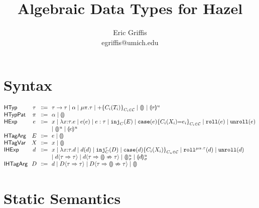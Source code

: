 \documentclass{article}
\title{Algebraic Data Types for Hazel}
\author{Eric Griffis \\ egriffis@umich.edu}
\date{}
\let\originalleft\left
\let\originalright\right
\renewcommand{\left}{\mathopen{}\mathclose\bgroup\originalleft}
\renewcommand{\right}{\aftergroup\egroup\originalright}
\newcommand\Sort[1]{\mathsf{#1}}
\newcommand\IHExp{\Sort{IHExp}}
\newcommand\IHTagArg{\Sort{IHTagArg}}
\newcommand\HExp{\Sort{HExp}}
\newcommand\HTagArg{\Sort{HTagArg}}
\newcommand\HTagVar{\Sort{HTagVar}}
\newcommand\HTyp{\Sort{HTyp}}
\newcommand\HTypPat{\Sort{HTypPat}}
\newcommand\hole[2][]{\llparenthesis#1\rrparenthesis^{#2}}
\newcommand\Dhole[3][]{\llparenthesis#1\rrparenthesis_{#2}^{#3}}
\newcommand\Tarrow[2]{#1 \rightarrow #2}
\newcommand\Trec[2]{\mu{#1}.{#2}}
\newcommand\Tsum[1]{+\mathopen{}\left\{#1\right\}}
\newcommand\TagSet{\mathcal{C}}
\newcommand\literal[1]{\mathtt{#1}}
\newcommand\asc[2]{{#1}:{#2}}
\newcommand\Efun[3]{\lambda{#1}{:}{#2}.{#3}}
\newcommand\Eapp[2]{{#1}\left({#2}\right)}
\newcommand\Einj[2]{\literal{inj}_{#1}\left({#2}\right)}
\newcommand\Ecase[2]{\literal{case} \left({#1}\right) \left\{{#2}\right\}}
\newcommand\Eroll[1]{\literal{roll}\left(#1\right)}
\newcommand\Eunroll[1]{\literal{unroll}\left(#1\right)}
\newcommand\Dfun[3]{\lambda{#1}{:}{#2}.{#3}}
\newcommand\Dapp[2]{{#1}\left({#2}\right)}
\newcommand\Dinj[3]{\literal{inj}_{#1}^{#2}\left({#3}\right)}
\newcommand\Dcase[2]{\literal{case} \left({#1}\right) \left\{{#2}\right\}}
\newcommand\Droll[3]{\literal{roll}^{\Trec{#1}{#2}}\left({#3}\right)}
\newcommand\Dunroll[1]{\literal{unroll}\left(#1\right)}
\newcommand\cast[3]{{#1}\langle{#2}\Rightarrow{#3}\rangle}
\newcommand\castfail[3]{{#1}\langle{#2}\Rightarrow{\llparenthesis\rrparenthesis}\nRightarrow{#3}\rangle}
\begin{document}
\maketitle


\section{Syntax}

\[
  \arraycolsep=0pt
  \begin{array}{l@{~~}c@{~~}c@{~~}l}
    \HTyp & \tau & \Coloneqq &
      \Tarrow{\tau}{\tau}
      \mid \alpha
      \mid \Trec{\pi}{\tau}
      \mid \Tsum{C_i(T_i)}_{C_i \in \TagSet}
      \mid \hole{}
      \mid \hole[\tau]{u}
      \\
    \HTypPat & \pi & \Coloneqq & \alpha \mid \hole{} \\
    \HExp & e & \Coloneqq &
      x
      \mid \Efun{x}{\tau}{e}
      \mid \Eapp{e}{e}
      \mid \asc{e}{\tau}
      \mid \Einj{C}{E}
      \mid \Ecase{e}{C_i(X_i){=}e_i}_{C_i \in \TagSet}
      \mid \Eroll{e}
      \mid \Eunroll{e}
      \\ & & &
      \mid \hole{u}
      \mid \hole[e]{u}
      \\
    \HTagArg & E & \Coloneqq & e \mid \hole{} \\
    \HTagVar & X & \Coloneqq & x \mid \hole{} \\
    \IHExp & d & \Coloneqq &
      x
      \mid \Dfun{x}{\tau}{d}
      \mid \Dapp{d}{d}
      \mid \Dinj{C}{\tau}{D}
      \mid \Dcase{d}{C_i(X_i)}_{C_u \in \TagSet}
      \mid \Droll{\alpha}{\tau}{d}
      \mid \Dunroll{d}
      \\ & & &
      \mid \cast{d}{\tau}{\tau}
      \mid \castfail{d}{\tau}{\tau}
      \mid \Dhole{\sigma}{u}
      \mid \Dhole[d]{\sigma}{u}
      \\
    \IHTagArg & D & \Coloneqq &
      d
      \mid \cast{D}{\tau}{\tau}
      \mid \castfail{D}{\tau}{\tau}
      \mid \hole{}
      \\
  \end{array}
\]


\section{Static Semantics}
\end{document}
